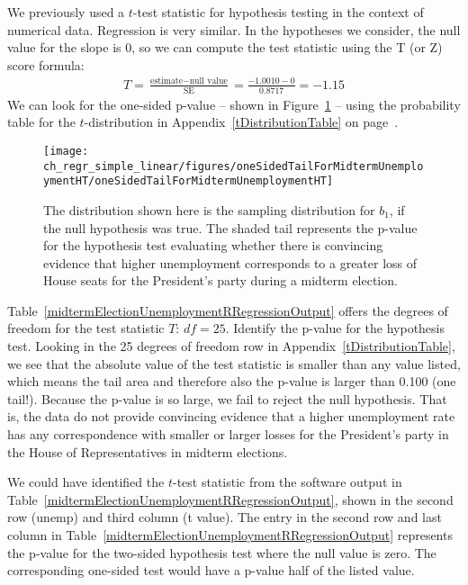 We previously used a $t$-test statistic for hypothesis testing in the context of numerical data. Regression is very similar. In the hypotheses we consider, the null value for the slope is 0, so we can compute the test statistic using the T (or Z) score formula:
\begin{align*}
T = \frac{\text{estimate} - \text{null value}}{\text{SE}} = \frac{-1.0010 - 0}{0.8717} = -1.15
\end{align*}
We can look for the one-sided p-value -- shown in Figure~\ref{oneSidedTailForMidtermUnemploymentHT} -- using the probability table for the $t$-distribution in Appendix~\ref{tDistributionTable} on page~\pageref{tDistributionTable}.

\begin{figure}[h]
\centering
\texttt{[image: ch\_regr\_simple\_linear/figures/oneSidedTailForMidtermUnemploymentHT/oneSidedTailForMidtermUnemploymentHT]}
\caption{The distribution shown here is the sampling distribution for $b_1$, if the null hypothesis was true. The shaded tail represents the p-value for the hypothesis test evaluating whether there is convincing evidence that higher unemployment corresponds to a greater loss of House seats for the President's party during a midterm election.}
\label{oneSidedTailForMidtermUnemploymentHT}
\end{figure}

\textC{\newpage}

\begin{example}{Table~\ref{midtermElectionUnemploymentRRegressionOutput} offers the degrees of freedom for the test statistic $T$: $df=25$. Identify the p-value for the hypothesis test.}
Looking in the 25 degrees of freedom row in Appendix~\ref{tDistributionTable}, we see that the absolute value of the test statistic is smaller than any value listed, which means the tail area and therefore also the p-value is larger than 0.100 (one tail!). Because the p-value is so large, we fail to reject the null hypothesis. That is, the data do not provide convincing evidence that a higher unemployment rate has any correspondence with smaller or larger losses for the President's party in the House of Representatives in midterm elections.
\end{example}

We could have identified the $t$-test statistic from the software output in Table~\ref{midtermElectionUnemploymentRRegressionOutput}, shown in the second row (unemp) and third column (t value). The entry in the second row and last column in Table~\ref{midtermElectionUnemploymentRRegressionOutput} represents the p-value for the two-sided hypothesis test where the null value is zero. The corresponding one-sided test would have a p-value half of the listed value.


